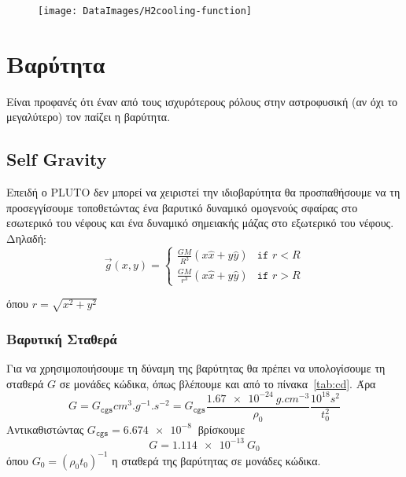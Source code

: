 %
	\begin{figure}[h]
		\centering
		\texttt{[image: DataImages/Η2cooling-function]}
		\caption{}
		\label{fig:h2cooling-function}
	\end{figure}
	
%





	\newpage
	
	\section{Βαρύτητα}
	Είναι προφανές ότι έναν από τους ισχυρότερους ρόλους στην αστροφυσική (αν όχι το μεγαλύτερο) τον παίζει η βαρύτητα. 
	
	\subsection{Self Gravity}
	\label{par:SolidSphereSelfGravit}
	Επειδή ο PLUTO δεν μπορεί να χειριστεί την ιδιοβαρύτητα θα προσπαθήσουμε να τη προσεγγίσουμε τοποθετώντας ένα βαρυτικό δυναμικό ομογενούς σφαίρας στο εσωτερικό του νέφους και ένα δυναμικό σημειακής μάζας στο εξωτερικό του νέφους. Δηλαδή:
	\begin{equation}
		\vec{g}(x,y) = 
		\begin{cases}
			\frac{GM}{R^3}(x \hat{x}+ y \hat{y}) &\texttt{if } r<R \\
			\frac{GM}{r^3}(x \hat{x}+ y \hat{y}) &\texttt{if } r>R
		\end{cases}
	\end{equation}
	
	όπου $r=\sqrt{x^2+y^2}$
	
	\subsubsection{Βαρυτική Σταθερά}
	Για να χρησιμοποιήσουμε τη δύναμη της βαρύτητας θα πρέπει να υπολογίσουμε τη σταθερά $G$ σε μονάδες κώδικα, όπως βλέπουμε και από το πίνακα~\ref{tab:cd}. Άρα 
	\begin{equation}
		G=G_\texttt{cgs} \si{cm^3.g^{-1}.s^{-2}} = G_\texttt{cgs} \frac{\SI{1.67e-24}{g.cm^{-3}}}{\rho_0}\frac{10^{18}\si{s^2}}{t^2_0}
	\end{equation}
	Αντικαθιστώντας $G_\texttt{cgs}=\SI{6.674e-8}{}$ βρίσκουμε
	\begin{equation}
		\boxed{G=\SI{1.114e-13}{G_0}}
	\end{equation}
	όπου $G_0=(\rho_0 t_0)^{-1}$ η σταθερά της βαρύτητας σε μονάδες κώδικα.
	
